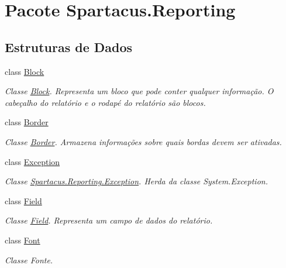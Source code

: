 \hypertarget{namespaceSpartacus_1_1Reporting}{\section{Pacote Spartacus.\+Reporting}
\label{namespaceSpartacus_1_1Reporting}
}
\subsection*{Estruturas de Dados}
\begin{DoxyCompactItemize}
\item 
class \hyperlink{classSpartacus_1_1Reporting_1_1Block}{Block}
\begin{DoxyCompactList}\small\item\em Classe \hyperlink{classSpartacus_1_1Reporting_1_1Block}{Block}. Representa um bloco que pode conter qualquer informação. O cabeçalho do relatório e o rodapé do relatório são blocos. \end{DoxyCompactList}\item 
class \hyperlink{classSpartacus_1_1Reporting_1_1Border}{Border}
\begin{DoxyCompactList}\small\item\em Classe \hyperlink{classSpartacus_1_1Reporting_1_1Border}{Border}. Armazena informações sobre quais bordas devem ser ativadas. \end{DoxyCompactList}\item 
class \hyperlink{classSpartacus_1_1Reporting_1_1Exception}{Exception}
\begin{DoxyCompactList}\small\item\em Classe \hyperlink{classSpartacus_1_1Reporting_1_1Exception}{Spartacus.\+Reporting.\+Exception}. Herda da classe System.\+Exception. \end{DoxyCompactList}\item 
class \hyperlink{classSpartacus_1_1Reporting_1_1Field}{Field}
\begin{DoxyCompactList}\small\item\em Classe \hyperlink{classSpartacus_1_1Reporting_1_1Field}{Field}. Representa um campo de dados do relatório. \end{DoxyCompactList}\item 
class \hyperlink{classSpartacus_1_1Reporting_1_1Font}{Font}
\begin{DoxyCompactList}\small\item\em Classe Fonte. \end{DoxyCompactList}\item 

\end{DoxyCompactItemize}
